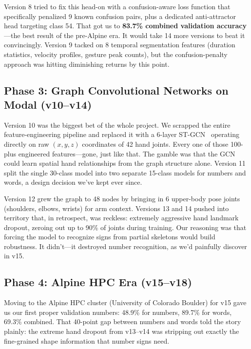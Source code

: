 \documentclass[conference]{IEEEtran}
\begin{document}
Version 8 tried to fix this head-on with a confusion-aware loss function that specifically penalized 9 known confusion pairs, plus a dedicated anti-attractor head targeting class 54. That got us to \textbf{83.7\% combined validation accuracy}---the best result of the pre-Alpine era. It would take 14 more versions to beat it convincingly. Version 9 tacked on 8 temporal segmentation features (duration statistics, velocity profiles, gesture peak counts), but the confusion-penalty approach was hitting diminishing returns by this point.

\subsection{Phase 3: Graph Convolutional Networks on Modal (v10--v14)}

Version 10 was the biggest bet of the whole project. We scrapped the entire feature-engineering pipeline and replaced it with a 6-layer ST-GCN~\cite{yan2018stgcn} operating directly on raw $(x,y,z)$ coordinates of 42 hand joints. Every one of those 100-plus engineered features---gone, just like that. The gamble was that the GCN could learn spatial hand relationships from the graph structure alone. Version 11 split the single 30-class model into two separate 15-class models for numbers and words, a design decision we've kept ever since.

Version 12 grew the graph to 48 nodes by bringing in 6 upper-body pose joints (shoulders, elbows, wrists) for arm context. Versions 13 and 14 pushed into territory that, in retrospect, was reckless: extremely aggressive hand landmark dropout, zeroing out up to 90\% of joints during training. Our reasoning was that forcing the model to recognize signs from partial skeletons would build robustness. It didn't---it destroyed number recognition, as we'd painfully discover in v15.

\subsection{Phase 4: Alpine HPC Era (v15--v18)}

Moving to the Alpine HPC cluster (University of Colorado Boulder) for v15 gave us our first proper validation numbers: 48.9\% for numbers, 89.7\% for words, 69.3\% combined. That 40-point gap between numbers and words told the story plainly: the extreme hand dropout from v13--v14 was stripping out exactly the fine-grained shape information that number signs need.
\end{document}
